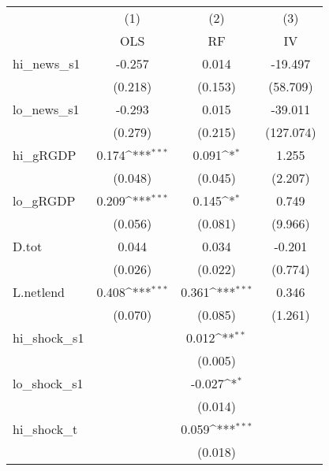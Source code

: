 {
\def\sym#1{\ifmmode^{#1}\else\(^{#1}\)\fi}
\begin{tabular}{l*{3}{c}}
\toprule
            &\multicolumn{1}{c}{(1)}&\multicolumn{1}{c}{(2)}&\multicolumn{1}{c}{(3)}\\
            &\multicolumn{1}{c}{OLS}&\multicolumn{1}{c}{RF}&\multicolumn{1}{c}{IV}\\
\midrule
hi\_news\_s1  &      -0.257         &       0.014         &     -19.497         \\
            &     (0.218)         &     (0.153)         &    (58.709)         \\
\addlinespace
lo\_news\_s1  &      -0.293         &       0.015         &     -39.011         \\
            &     (0.279)         &     (0.215)         &   (127.074)         \\
\addlinespace
hi\_gRGDP    &       0.174\sym{***}&       0.091\sym{*}  &       1.255         \\
            &     (0.048)         &     (0.045)         &     (2.207)         \\
\addlinespace
lo\_gRGDP    &       0.209\sym{***}&       0.145\sym{*}  &       0.749         \\
            &     (0.056)         &     (0.081)         &     (9.966)         \\
\addlinespace
D.tot       &       0.044         &       0.034         &      -0.201         \\
            &     (0.026)         &     (0.022)         &     (0.774)         \\
\addlinespace
L.netlend   &       0.408\sym{***}&       0.361\sym{***}&       0.346         \\
            &     (0.070)         &     (0.085)         &     (1.261)         \\
\addlinespace
hi\_shock\_s1 &                     &       0.012\sym{**} &                     \\
            &                     &     (0.005)         &                     \\
\addlinespace
lo\_shock\_s1 &                     &      -0.027\sym{*}  &                     \\
            &                     &     (0.014)         &                     \\
\addlinespace
hi\_shock\_t  &                     &       0.059\sym{***}&                     \\
            &                     &     (0.018)         &                     \\

\end{tabular}}
